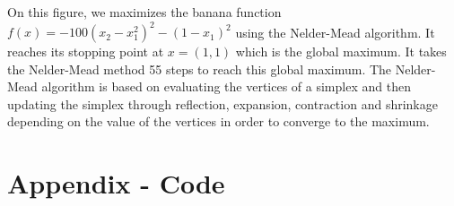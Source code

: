 \documentclass{article}
\begin{document}
On this figure, we maximizes the banana function $f(x)=-100(x_2-x_1^2)^2-(1-x_1)^2$ using the Nelder-Mead algorithm. It reaches its stopping point at $x=(1,1)$ which is the global maximum. It takes the Nelder-Mead method 55 steps to reach this global maximum. The Nelder-Mead algorithm is based on evaluating the vertices of a simplex and then updating the simplex through reflection, expansion, contraction and shrinkage depending on the value of the vertices in order to converge to the maximum.
\clearpage

\appendix
\section*{Appendix - Code}


\clearpage


\clearpage


\clearpage
\end{document}
